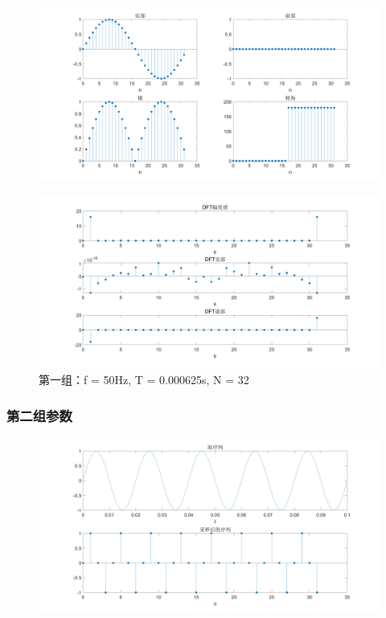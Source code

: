 \documentclass{../source/Experiment copy}
\begin{document}
                \begin{figure}[H]
                    \centering
                    \includegraphics[width = \textwidth]{src/exp2_1_2.png}
                \end{figure}

                \begin{figure}[H]
                    \centering
                    \includegraphics[width = \textwidth]{src/exp2_1_3.png}
                    \caption{第一组：f = 50Hz, T = 0.000625s, N = 32}
                \end{figure}

            \subsubsection{第二组参数}
                \begin{figure}[H]
                    \centering
                    \includegraphics[width = \textwidth]{src/exp2_2_1.png}
                \end{figure}
\end{document}
